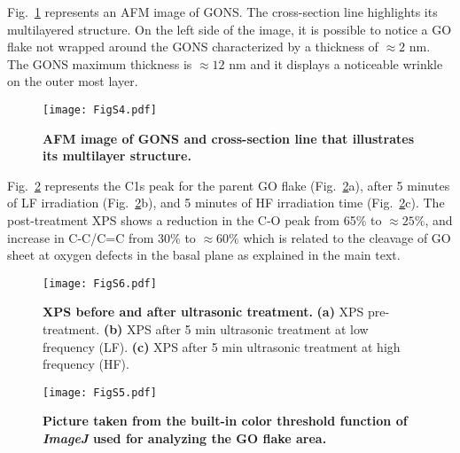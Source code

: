 \clearpage

Fig.~\ref{figS5_AppB} represents an AFM image of GONS. The cross-section line highlights its multilayered structure. On the left side of the image, it is possible to notice a GO flake not wrapped around the GONS characterized by a thickness of $\approx2$ nm. The GONS maximum thickness is $\approx12$ nm and it displays a noticeable wrinkle on the outer most layer.

\begin{figure}[h!]
  \centering
  \texttt{[image: FigS4.pdf]}
  \caption{\textbf{AFM image of GONS and cross-section line that illustrates its multilayer structure.}}
  \label{figS5_AppB}
\end{figure}

\clearpage

Fig.~\ref{figS6_AppB} represents the C1s peak for the parent GO flake (Fig.~\ref{figS6_AppB}a), after 5 minutes of LF irradiation (Fig.~\ref{figS6_AppB}b), and 5 minutes of HF irradiation time (Fig.~\ref{figS6_AppB}c). The post-treatment XPS shows a reduction in the C-O peak from 65\% to $\approx25\%$, and increase in C-C/C=C from 30\% to $\approx60\%$ which is related to the cleavage of GO sheet at oxygen defects in the basal plane as explained in the main text.

\begin{figure}[h!]
  \centering
  \texttt{[image: FigS6.pdf]}
  \caption{\textbf{XPS before and after ultrasonic treatment.} \textbf{(a)} XPS pre-treatment. \textbf{(b)} XPS after 5 min ultrasonic treatment at low frequency (LF). \textbf{(c)} XPS after 5 min ultrasonic treatment at high frequency (HF).}
  \label{figS6_AppB}
\end{figure}

\newpage


\begin{figure}[h!]
  \centering
  \texttt{[image: FigS5.pdf]}
  \caption{\textbf{Picture taken from the built-in color threshold function of \textit{ImageJ} used for analyzing the GO flake area.}}
  \label{figS7_AppB}
\end{figure}


